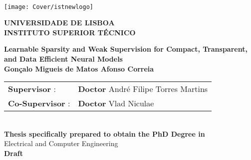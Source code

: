 \setcounter{page}{1} 


\thispagestyle{empty}
\begin{flushleft} ~\\ \vspace{-22mm} \hspace{-12mm}  \texttt{[image: Cover/istnewlogo]}

    \centering
    \Large \textbf{UNIVERSIDADE DE LISBOA \\ INSTITUTO SUPERIOR TÉCNICO}
    \vspace{30mm}

    \vspace{5mm}

    \centering
    \Large \textbf{Learnable Sparsity and Weak Supervision for Compact, Transparent, and Data Efficient Neural Models}
    \\ \vspace{2cm}  %
    \large \textbf{Gonçalo Migueis de Matos Afonso Correia} \\
    \vspace{3cm}

    \begin{minipage}{\textwidth}
        \begin{tabularx}{\textwidth}{ l @{ } l }
            \textbf{Supervisor} :    & \textbf{Doctor} André Filipe Torres Martins \\
            \textbf{Co-Supervisor} : & \textbf{Doctor} Vlad Niculae                \\
        \end{tabularx}
    \end{minipage}
    \\ \vspace{20mm}
    \centering
    \large \textbf{Thesis specifically prepared to obtain the PhD Degree in}\\
    \large Electrical and Computer Engineering\\
    \vspace{18mm}
    \Large \textbf{Draft}


\end{flushleft}
